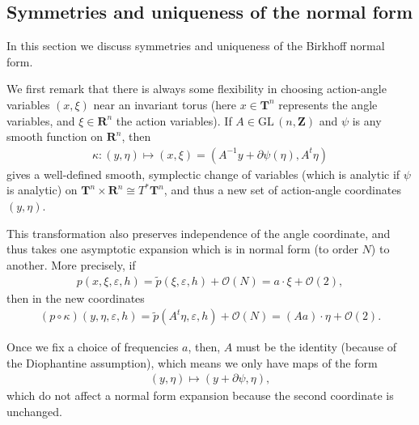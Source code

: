 \documentclass[12pt,lettersize]{article}
\renewcommand{\epsilon}{\varepsilon}
\newcommand{\grad}{\nabla}
\newcommand{\tw}{\widetilde}%
\theoremstyle{plain}%
\numberwithin{theorem}{section}
\numberwithin{equation}{section}
\theoremstyle{definition}
\theoremstyle{remark}
\begin{document}
{%

\subsection{Symmetries and uniqueness of the normal form}\label{BNFuniq}

In this section we discuss symmetries and uniqueness of the Birkhoff normal form.

We first remark that there is always some flexibility in choosing action-angle variables $(x,\xi)$ near an invariant torus (here $x \in \mathbf{T}^n$ represents the angle variables, and $\xi \in \mathbf{R}^n$ the action variables). If $A\in \mbox{GL}\,(n,\mathbf{Z})$ and $\psi$ is any smooth function on $\mathbf{R}^n$, then 
%
\begin{align}\label{changewithA}
\kappa:(y,\eta) \mapsto (x,\xi) = (A^{-1}y + \partial \psi(\eta), A^t \eta) 
\end{align}
%
gives a well-defined smooth, symplectic change of variables (which is analytic if $\psi$ is analytic) on $\mathbf{T}^n \times \mathbf{R}^n \cong T^*\mathbf{T}^n$, and thus a new set of action-angle coordinates $(y,\eta)$. 

This transformation also preserves independence of the angle coordinate, and thus takes one asymptotic expansion which is in normal form (to order $N$) to another. More precisely, if 
%
\begin{align*}{}
p(x,\xi,\epsilon,h) = \tw p(\xi,\epsilon,h) + \mathcal{O}(N) = a\cdot \xi + \mathcal{O}(2),
\end{align*}
%
then in the new coordinates
%
\begin{align*}{}
(p\circ \kappa)(y,\eta,\epsilon,h) = \tw p(A^t\eta,\epsilon,h) + \mathcal{O}(N) = (Aa)\cdot \eta + \mathcal{O}(2).
\end{align*}




Once we fix a choice of frequencies $a$, then, $A$ must be the identity (because of the Diophantine assumption), which means we only have maps of the form
%
\begin{align}\label{change}
(y,\eta) \mapsto (y +\partial\psi, \eta),
\end{align}
%
which do not affect a normal form expansion because the second coordinate is unchanged.

}
\end{document}
